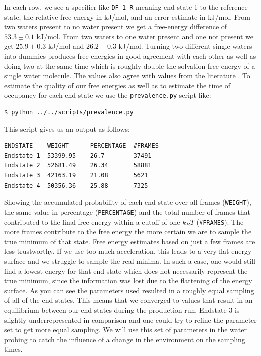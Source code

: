 In each row, we see a specifier like \texttt{DF\_1\_R} meaning end-state 1 to the reference state, the relative free energy in kJ/mol, and an error estimate in kJ/mol. From two waters present to no water present we get a free-energy difference of $53.3 \pm 0.1$ kJ/mol. From two waters to one water present and one not present we get $25.9 \pm 0.3$ kJ/mol and $26.2 \pm 0.3$ kJ/mol. Turning two different single waters into dummies produces free energies in good agreement with each other as well as doing two at the same time which is roughly double the solvation free energy of a single water molecule. The values also agree with values from the literature \cite{gracia1}. To estimate the quality of our free energies as well as to estimate the time of occupancy for each end-state we use the \texttt{prevalence.py} script like:

\begin{lstlisting}
$ python ../../scripts/prevalence.py
\end{lstlisting}

This script gives us an output as follows: 

\begin{lstlisting}
ENDSTATE    WEIGHT      PERCENTAGE  #FRAMES
Endstate 1  53399.95    26.7        37491
Endstate 2  52681.49    26.34       58881
Endstate 3  42163.19    21.08       5621
Endstate 4  50356.36    25.88       7325
\end{lstlisting}

Showing the accumulated probability of each end-state over all frames (\texttt{WEIGHT}), the same value in percentage (\texttt{PERCENTAGE}) and the total number of frames that contributed to the final free energy within a cutoff of one $k_BT$ (\texttt{\#FRAMES}). The more frames contribute to the free energy the more certain we are to sample the true minimum of that state. Free energy estimates based on just a few frames are less trustworthy. If we use too much acceleration, this leads to a very flat energy surface and we struggle to sample the real minima. In such a case, one would still find a lowest energy for that end-state which does not necessarily represent the true minimum, since the information was lost due to the flattening of the energy surface. 
As you can see the parameters used resulted in a roughly equal sampling of all of the end-states. This means that we converged to values that result in an equilibrium between our end-states during the production run. Endstate 3 is slightly underrepresented in comparison and one could try to refine the parameter set to get more equal sampling. We will use this set of parameters in the water probing to catch the influence of a change in the environment on the sampling times.


